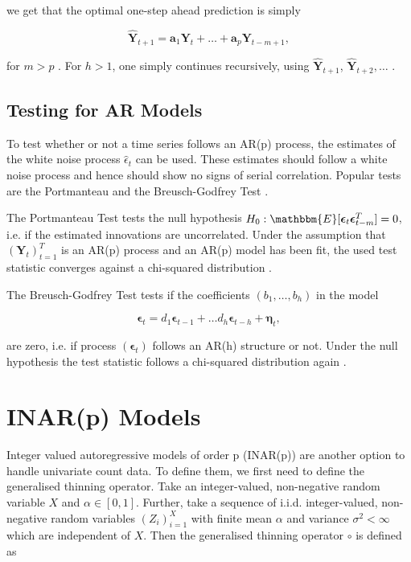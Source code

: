 we get that the optimal one-step ahead prediction is simply 

\begin{equation}
\hat{\bm{Y}}_{t+1} = \bm{a}_1\bm{Y}_{t} + \ldots + \bm{a}_p\bm{Y}_{t-m+1},
\label{eq:AR 1step Forecasting}
\end{equation}

for $m>p$ \cite{Scherrer:2021}. For $h>1$, one simply continues recursively, using $\hat{\bm{Y}}_{t+1}$, $\hat{\bm{Y}}_{t+2},\ldots$ .

\subsection{Testing for AR Models}
\label{sec: Testing for ar models}

To test whether or not a time series follows an AR(p) process, the estimates of the white noise process $\hat{\epsilon}_t$ can be used. These estimates should follow a white noise process and hence should show no signs of serial correlation. Popular tests are the Portmanteau and the Breusch-Godfrey Test \cite{Scherrer:2021}. 

The Portmanteau Test tests the null hypothesis $H_0: \mathbbm{E}[\bm{\epsilon}_t \bm{\epsilon}_{t-m}^T]=0$, i.e. if the estimated innovations are uncorrelated. Under the assumption that $(\bm{Y}_t)_{t=1}^T$ is an AR(p) process and an AR(p) model has been fit, the used test statistic converges against a chi-squared distribution \cite{Scherrer:2021}. 

The Breusch-Godfrey Test tests if the coefficients $(b_1,\ldots,b_h)$ in the model 

\begin{equation}
\bm{\epsilon}_t = d_1\bm{\epsilon}_{t-1} +\ldots d_h \bm{\epsilon}_{t-h} + \bm{\eta}_t,
\label{eq:Breusch-Godfrey Test model}
\end{equation}

are zero, i.e. if process $(\bm{\epsilon}_t)$ follows an AR(h) structure or not. Under the null hypothesis the test statistic follows a chi-squared distribution again \cite{Scherrer:2021}. 

\section{INAR(p) Models}
\label{sec: Inar Models}

Integer valued autoregressive models of order p (INAR(p)) are another option to handle univariate count data. To define them, we first need to define the generalised thinning operator. Take an integer-valued, non-negative random variable $X$ and $\alpha \in [0,1]$. Further, take a sequence of i.i.d. integer-valued, non-negative random variables $(Z_i)_{i=1}^X$ with finite mean $\alpha$ and variance $\sigma^2<\infty $ which are independent of $X$. Then the generalised thinning operator $\circ$ is defined as


